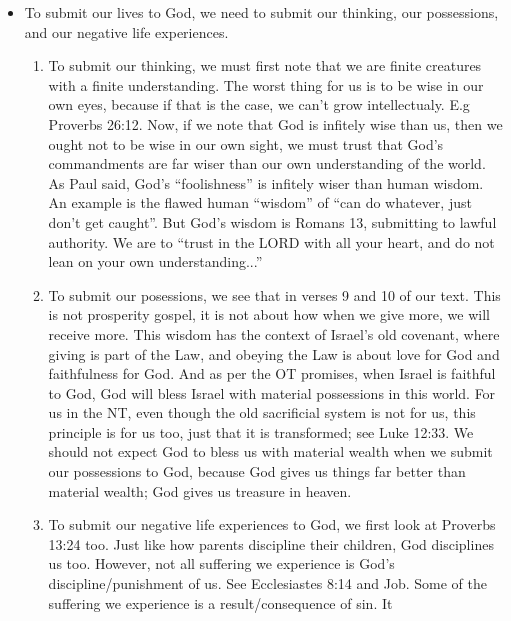\begin{itemize}
{\begin{itemize}
{    might lead to us sacrificing something on our end.  However, living the
    good life is not about maximising our self pleasure, but it is about the
    collective shalom of all, which is God's original plan for humanity
    anyway.}
    \item{To submit our lives to God, we need to submit our thinking, our
    possessions, and our negative life experiences.
    \begin{enumerate}
      \item{To submit our thinking, we must first note that we are finite
      creatures with a finite understanding.  The worst thing for us is to be
      wise in our own eyes, because if that is the case, we can't grow
      intellectualy.  E.g Proverbs 26:12.  Now, if we note that God is
      infitely wise than us, then we ought not to be wise in our own sight,
      we must trust that God's commandments are far wiser than our own
      understanding of the world.  As Paul said, God's ``foolishness'' is
      infitely wiser than human wisdom.  An example is the flawed human
      ``wisdom'' of ``can do whatever, just don't get caught''.  But God's
      wisdom is Romans 13, submitting to lawful authority.  We are to ``trust
      in the LORD with all your heart, and do not lean on your own
      understanding...''}
      \item{To submit our posessions, we see that in verses 9 and 10 of our
      text.  This is not prosperity gospel, it is not about how when we give
      more, we will receive more.  This wisdom has the context of Israel's
      old covenant, where giving is part of the Law, and obeying the Law is
      about love for God and faithfulness for God.  And as per the OT
      promises, when Israel is faithful to God, God will bless Israel with
      material possessions in this world.  For us in the NT, even though the old
      sacrificial system is not for us, this principle is for us too, just
      that it is transformed; see Luke 12:33.  We should not expect God to
      bless us with material wealth when we submit our possessions to God, because God gives us things far better than material wealth; God gives us treasure in heaven.}
      \item{To submit our negative life experiences to God, we first look at
      Proverbs 13:24 too.  Just like how parents discipline their children,
      God disciplines us too.  However, not all suffering we experience is
      God's discipline/punishment of us.  See Ecclesiastes 8:14 and Job.
      Some of the suffering we experience is a result/consequence of sin.  It
}
\end{enumerate}}
\end{itemize}}
\end{itemize}
